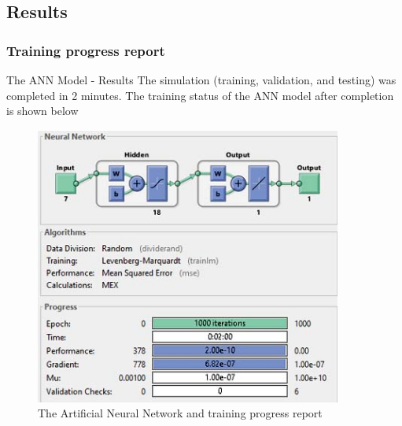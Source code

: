 \documentclass{beamer}
\begin{document}
\subsection{Results}
\subsubsection{Training progress report}
\begin{frame}{The ANN Model - Results}
    The simulation (training, validation, and testing) was completed in 2 minutes. The training status of the ANN model after completion is shown below
    \begin{figure}
        \centering
        \includegraphics[width=0.5\columnwidth]{Figures/ANN-report.png}
        \caption{The Artificial Neural Network and training progress report}
        \label{ANN-report}
    \end{figure}
\end{frame}
\end{document}
